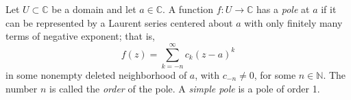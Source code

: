 \documentclass{article}
\begin{document}
Let $U \subset \mathbb{C}$ be a domain and let $a \in \mathbb{C}$. A function $f\colon U \to \mathbb{C}$ has a \emph{pole} at $a$ if it can be represented by a Laurent series centered about $a$ with only finitely many terms of negative exponent; that is,
\[
f(z) = \sum_{k=-n}^\infty c_k (z-a)^k
\]
in some nonempty deleted neighborhood of $a$, with $c_{-n} \neq 0$, for some $n \in \mathbb{N}$. The number $n$ is called the \emph{order} of the pole. A \emph{simple pole} is a pole of order 1.
\end{document}
